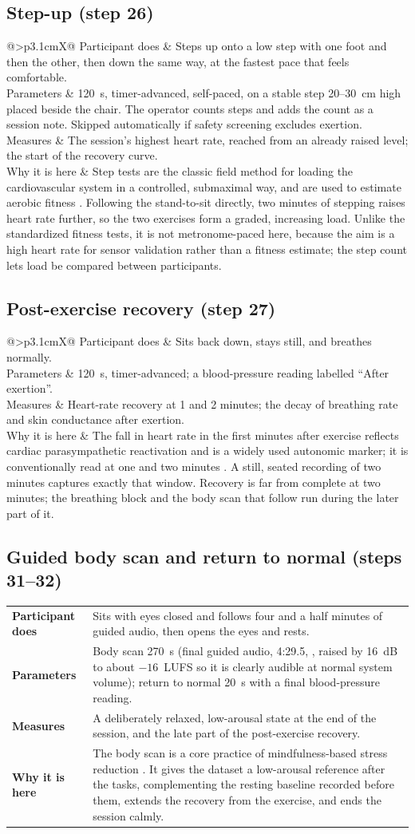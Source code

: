 \documentclass[11pt,a4paper]{article}
\makeatletter
\newcommand{\code}[1]{\texttt{\detokenize{#1}}}
\newcommand{\taskdetail}[4]{%
  \begin{tabularx}{\linewidth}{@{}>{\bfseries}p{3.1cm}X@{}}
    Participant does & #1 \\
    Parameters & #2 \\
    Measures & #3 \\
    Why it is here & #4 \\
  \end{tabularx}}
\makeatother
\begin{document}
\subsection{Step-up (step 26)}
\taskdetail
{Steps up onto a low step with one foot and then the other, then down the same way, at the fastest pace that feels
comfortable.}
{120~s, timer-advanced, self-paced, on a stable step 20--30~cm high placed beside the chair. The operator counts
steps and adds the count as a session note. Skipped automatically if safety screening excludes exertion.}
{The session's highest heart rate, reached from an already raised level; the start of the recovery curve.}
{Step tests are the classic field method for loading the cardiovascular system in a controlled, submaximal way,
and are used to estimate aerobic fitness \cite{bennett2016}. Following the stand-to-sit directly, two minutes of
stepping raises heart rate further, so the two exercises form a graded, increasing load. Unlike the standardized
fitness tests, it is not metronome-paced here, because the aim is a high heart rate for sensor validation rather
than a fitness estimate; the step count lets load be compared between participants.}

\subsection{Post-exercise recovery (step 27)}
\taskdetail
{Sits back down, stays still, and breathes normally.}
{120~s, timer-advanced; a blood-pressure reading labelled ``After exertion''.}
{Heart-rate recovery at 1 and 2 minutes; the decay of breathing rate and skin conductance after exertion.}
{The fall in heart rate in the first minutes after exercise reflects cardiac parasympathetic reactivation and is a
widely used autonomic marker; it is conventionally read at one and two minutes \cite{cole1999,stanley2013}. A
still, seated recording of two minutes captures exactly that window. Recovery is far from complete at two
minutes; the breathing block and the body scan that follow run during the later part of it.}

\subsection{Guided body scan and return to normal (steps 31--32)}
\taskdetail
{Sits with eyes closed and follows four and a half minutes of guided audio, then opens the eyes and rests.}
{Body scan 270~s (final guided audio, 4:29.5, \code{bodyscan-final-loud.mp4}, raised by 16~dB to about $-16$~LUFS so it is clearly audible at normal system volume); return to normal 20~s with a final blood-pressure reading.}
{A deliberately relaxed, low-arousal state at the end of the session, and the late part of the post-exercise
recovery.}
{The body scan is a core practice of mindfulness-based stress reduction \cite{kabatzinn1990}. It gives the dataset
a low-arousal reference after the tasks, complementing the resting baseline recorded before them, extends the
recovery from the exercise, and ends the session calmly.}
\end{document}
